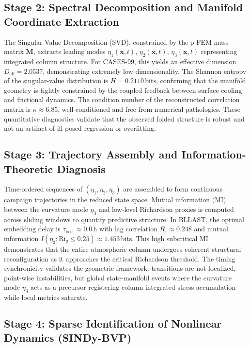 \documentclass[12pt,a4paper]{article}
\newcommand{\Rig}{\mathrm{Ri}_g}
\newcommand{\vect}[1]{\mathbf{#1}}
\newcommand{\mat}[1]{\mathbf{#1}}
\begin{document}
\subsection{Stage 2: Spectral Decomposition and Manifold Coordinate Extraction}

The Singular Value Decomposition (SVD), constrained by the p-FEM mass matrix $\mat{M}$, extracts leading modes $\eta_1(\vect{x}, t)$, $\eta_2(\vect{x}, t)$, $\eta_3(\vect{x}, t)$ representing integrated column structure. For CASES-99, this yields an effective dimension $D_{\text{eff}} = 2.0537$, demonstrating extremely low dimensionality. The Shannon entropy of the singular-value distribution is $H = 0.2110\,\mathrm{bits}$, confirming that the manifold geometry is tightly constrained by the coupled feedback between surface cooling and frictional dynamics. The condition number of the reconstructed correlation matrix is $\kappa \approx 6.85$, well-conditioned and free from numerical pathologies. These quantitative diagnostics validate that the observed folded structure is robust and not an artifact of ill-posed regression or overfitting.

\subsection{Stage 3: Trajectory Assembly and Information-Theoretic Diagnosis}

Time-ordered sequences of $(\eta_1, \eta_2, \eta_3)$ are assembled to form continuous campaign trajectories in the reduced state space. Mutual information (MI) between the curvature mode $\eta_3$ and low-level Richardson proxies is computed across sliding windows to quantify predictive structure. In BLLAST, the optimal embedding delay is $\tau_{\text{best}} \approx 0.0\,\mathrm{h}$ with lag correlation $R_\tau \approx 0.248$ and mutual information $I(\eta_3; \Rig \leq 0.25) \approx 1.453\,\mathrm{bits}$. This high subcritical MI demonstrates that the entire atmospheric column undergoes coherent structural reconfiguration as it approaches the critical Richardson threshold. The timing synchronicity validates the geometric framework: transitions are not localized, point-wise instabilities, but global state-manifold events where the curvature mode $\eta_3$ acts as a precursor registering column-integrated stress accumulation while local metrics saturate.

\subsection{Stage 4: Sparse Identification of Nonlinear Dynamics (SINDy-BVP)}
\end{document}

